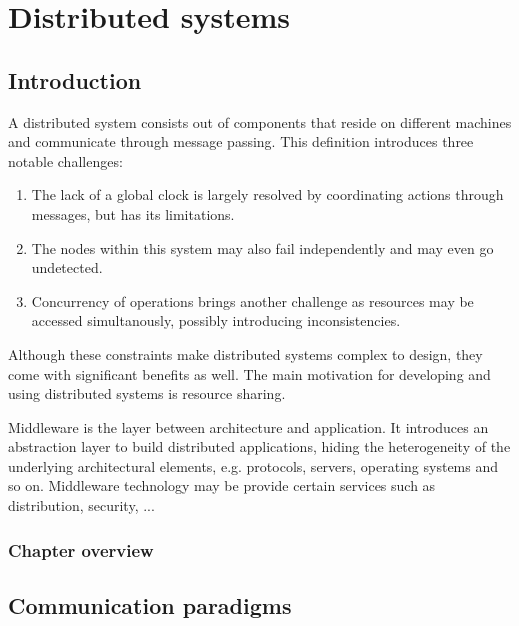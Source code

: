 \chapter{Distributed systems}\label{chapter:distributed-systems}


\section{Introduction}

A distributed system consists out of components that reside on different machines and communicate through message passing. This definition introduces three notable challenges:

\begin{enumerate}
	\item The lack of a global clock is largely resolved by coordinating actions through messages, but has its limitations.
	\item The nodes within this system may also fail independently and may even go undetected.
	\item Concurrency of operations brings another challenge as resources may be accessed simultanously, possibly introducing inconsistencies.
\end{enumerate}

Although these constraints make distributed systems complex to design, they come with significant benefits as well. The main motivation for developing and using distributed systems is resource sharing.

Middleware is the layer between architecture and application. It introduces an abstraction layer to build distributed applications, hiding the heterogeneity of the underlying architectural elements, e.g. protocols, servers, operating systems and so on. Middleware technology may be provide certain services such as distribution, security, ... \cite{Coulouris:2011:DSC:2029110}

\subsection{Chapter overview}




\section{Communication paradigms}

